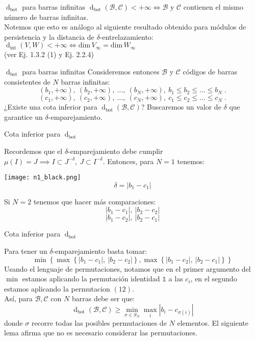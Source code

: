 \documentclass{beamer}
\def \dim{{\mbox {dim}}\,}
\newcommand{\calB}{{\mathcal{B}}}
\newcommand{\calC}{{\mathcal{C}}}
\def\dint{\operatorname{d}_{\operatorname{int}}}
\def\dbot{\operatorname{d}_{\operatorname{bot}}}
\begin{document}
\begin{frame}{\(\dbot\) para barras infinitas}
$\dbot(\calB,\calC)<+\infty \iff \calB$ y $\calC$ contienen el mismo número de barras infinitas.\\
\pause
Notemos que esto es análogo al siguiente resultado obtenido para módulos de persistencia y la distancia de $\delta$-entrelazamiento: \\
\pause
$\dint(V,W)<+\infty \iff \dim V_\infty = \dim W_\infty$ \\
\pause
(ver Ej. 1.3.2 (1) y Ej. 2.2.4)
\end{frame}

\begin{frame}{\(\dbot\) para barras infinitas}
    Consideremos entonces \(\calB\) y \(\calC\) códigos de barras consistentes de $N$ barras infinitas:
    \pause
    \[(b_1, +\infty),\ (b_2, +\infty),\ \ldots,\ (b_N, +\infty),\ b_1\leq b_2 \leq \ldots \leq b_N \;.\]
    \pause
    \[(c_1, +\infty),\ (c_2, +\infty),\ \ldots,\ (c_N, +\infty),\ c_1\leq c_2 \leq \ldots \leq c_N \;.\]
    \pause
    ¿Existe una cota inferior para $\dbot(\calB,\calC)$? Buscaremos un valor de $\delta$ que garantice un $\delta$-emparejamiento.
\end{frame}


\begin{frame}{Cota inferior para \(\dbot\)}

Recordemos que el $\delta$-emparejamiento debe cumplir $\mu (I) = J \implies I \subset J^{-\delta},\ J \subset I^{-\delta}$.
\pause
Entonces, para $N=1$ tenemos:
 \begin{center}
\texttt{[image: n1\_black.png]}
\[\delta = |b_1 - c_1|\]
\end{center}
\pause 
Si $N=2$ tenemos que hacer más comparaciones:
\[|b_1 - c_1|,\ |b_2 - c_2|\]
\[|b_1 - c_2|,\ |b_2 - c_1|\]
\end{frame}

\begin{frame}{Cota inferior para \(\dbot\)}

Para tener un $\delta$-emparejamiento basta tomar:
\[\min \left\{ \max \left\{ |b_1 - c_1|,\ |b_2 - c_2| \right\}, \max \left\{ |b_1 - c_2|,\ |b_2 - c_1| \right\} \right\}
\]
\pause
Usando el lenguaje de permutaciones, notamos que en el primer argumento del $\min$ estamos aplicando la permutación identidad $\mathds{1}$ a las $c_i$, \pause en el segundo estamos aplicando la permutacion $(12)$.\\
\pause
Así, para $\calB, \calC$ con $N$ barras debe ser que:
\[\dbot(\calB, \calC) \geq \min_{\sigma\in S_N} \max_{i} |b_i - c_{\sigma(i)}|\]
donde $\sigma$ recorre todas las posibles permutaciones de $N$ elementos. 
\pause
El siguiente lema afirma que no es necesario considerar las permutaciones. 

 \end{frame}
\end{document}
